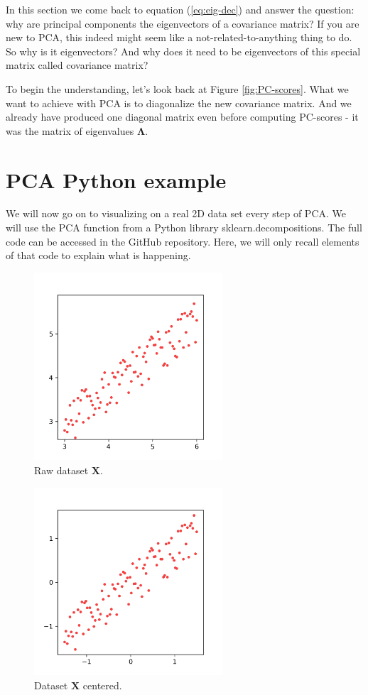 \documentclass[10pt,twocolumn]{article}
\begin{document}
In this section we come back to equation (\ref{eq:eig-dec}) and answer the question: why are principal components the eigenvectors of a covariance matrix? If you are new to PCA, this indeed might seem like a not-related-to-anything thing to do. So why is it eigenvectors? And why does it need to be eigenvectors of this special matrix called covariance matrix?

To begin the understanding, let's look back at Figure \ref{fig:PC-scores}. What we want to achieve with PCA is to diagonalize the new covariance matrix. And we already have produced one diagonal matrix even before computing PC-scores - it was the matrix of eigenvalues $\bm{\Lambda}$.




\section{PCA Python example}

We will now go on to visualizing on a real 2D data set every step of PCA. We will use the PCA function from a Python library sklearn.decompositions. The full code can be accessed in the GitHub repository. Here, we will only recall elements of that code to explain what is happening.


\begin{figure}[H]
\centering\includegraphics[width=7cm]{python-raw-data.png}
\caption{Raw dataset $\bm{X}$.}
\label{fig:python-raw-data}
\end{figure}

\begin{figure}[H]
\centering\includegraphics[width=7cm]{python-data-centered.png}
\caption{Dataset $\bm{X}$ centered.}
\label{fig:python-raw-data-centered}
\end{figure}
\end{document}
